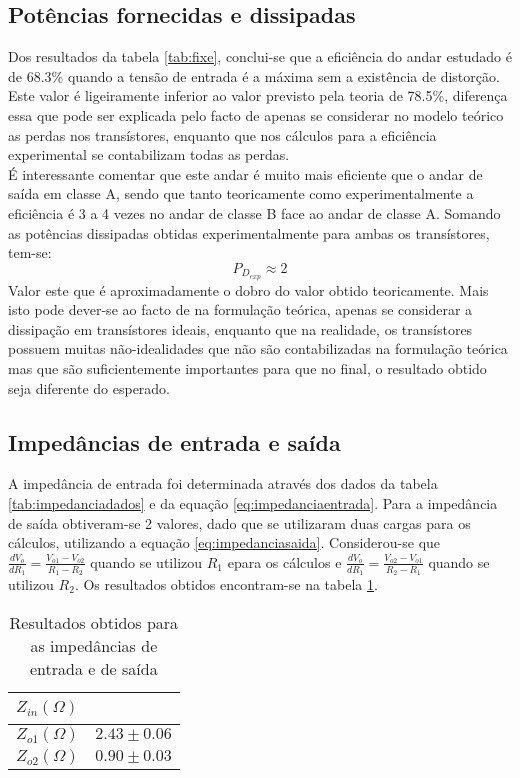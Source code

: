 \documentclass[%
  reprint,
  nofootinbib,
  amsmath,amssymb,
  aps,
  10pt,
  a4paper
]{revtex4-1}
\begin{document}
\subsection{Potências fornecidas e dissipadas}
Dos resultados da tabela \ref{tab:fixe}, conclui-se que a eficiência do andar estudado é de 68.3\% quando a tensão de entrada é a máxima sem a existência de distorção. Este valor é ligeiramente inferior ao valor previsto pela teoria de 78.5\%, diferença essa que pode ser explicada pelo facto de apenas se considerar no modelo teórico as perdas nos transístores, enquanto que nos cálculos para a eficiência experimental se contabilizam todas as perdas.\\
É interessante comentar que este andar é muito mais eficiente que o andar de saída em classe A, sendo que tanto teoricamente como experimentalmente a eficiência é 3 a 4 vezes no andar de classe B face ao andar de classe A.
Somando as potências dissipadas obtidas experimentalmente para ambas os transístores, tem-se:
\begin{equation}
P_{D_{exp}}\approx 2
\end{equation}
Valor este que é aproximadamente o dobro do valor obtido teoricamente. Mais isto pode dever-se ao facto de na formulação teórica, apenas se considerar a dissipação em transístores ideais, enquanto que na realidade, os transístores possuem muitas não-idealidades que não são contabilizadas na formulação teórica mas que são suficientemente importantes para que no final, o resultado obtido seja diferente do esperado.

\subsection{Impedâncias de entrada e saída}

A impedância de entrada foi determinada através dos dados da tabela \ref{tab:impedanciadados} e da equação \ref{eq:impedanciaentrada}. Para a impedância de saída obtiveram-se 2 valores, dado que se utilizaram duas cargas para os cálculos, utilizando a equação \ref{eq:impedanciasaida}. Considerou-se que $\frac{dV_o}{dR_1}=\frac{V_{o1}-V_{o2}}{R_1-R_2}$ quando se utilizou $R_1$ epara os cálculos e  $\frac{dV_o}{dR_1}=\frac{V_{o2}-V_{o1}}{R_2-R_1}$ quando se utilizou $R_2$. Os resultados obtidos encontram-se na tabela \ref{tab:impedanciaresultados}.

\begin{table}[h]
    \begin{tabular}{|l|l|}
    \hline
    $Z_{in} (\Omega)$ & ~ \\ \hline
    $Z_{o1} (\Omega)$ & $2.43 \pm0.06$ \\ \hline
    $Z_{o2} (\Omega)$ & $0.90 \pm 0.03$ \\ \hline
    \end{tabular}
\caption{Resultados obtidos para as impedâncias de entrada e de saída}
\label{tab:impedanciaresultados}
\end{table}
\end{document}
